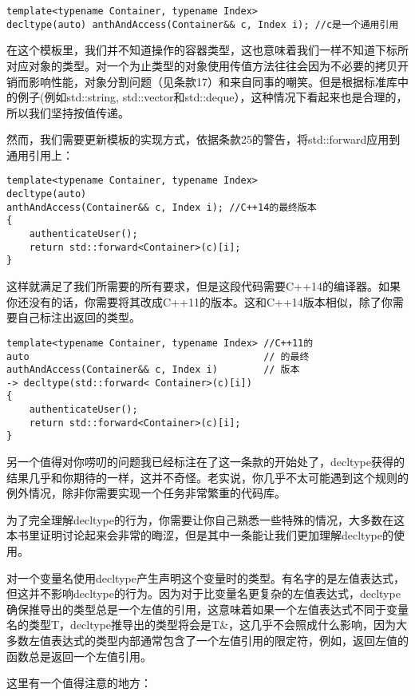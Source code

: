 \begin{lstlisting}
template<typename Container, typename Index>
decltype(auto) anthAndAccess(Container&& c, Index i); //c是一个通用引用
\end{lstlisting}

在这个模板里，我们并不知道操作的容器类型，这也意味着我们一样不知道下标所对应对象的类型。对一个为止类型的对象使用传值方法往往会因为不必要的拷贝开销而影响性能，对象分割问题（见条款17）和来自同事的嘲笑。但是根据标准库中的例子(例如std::string, std::vector和std::deque），这种情况下看起来也是合理的，所以我们坚持按值传递。

然而，我们需要更新模板的实现方式，依据条款25的警告，将std::forward应用到通用引用上：

\begin{lstlisting}
template<typename Container, typename Index>
decltype(auto)
anthAndAccess(Container&& c, Index i); //C++14的最终版本
{
	authenticateUser();
	return std::forward<Container>(c)[i];
}
\end{lstlisting}

这样就满足了我们所需要的所有要求，但是这段代码需要C++14的编译器。如果你还没有的话，你需要将其改成C++11的版本。这和C++14版本相似，除了你需要自己标注出返回的类型。

\begin{lstlisting}
template<typename Container, typename Index> //C++11的 
auto                                         // 的最终 
authAndAccess(Container&& c, Index i)        // 版本
-> decltype(std::forward< Container>(c)[i]) 
{ 
	authenticateUser(); 
	return std::forward<Container>(c)[i]; 
}
\end{lstlisting}

另一个值得对你唠叨的问题我已经标注在了这一条款的开始处了，decltype获得的结果几乎和你期待的一样，这并不奇怪。老实说，你几乎不太可能遇到这个规则的例外情况，除非你需要实现一个任务非常繁重的代码库。

为了完全理解decltype的行为，你需要让你自己熟悉一些特殊的情况，大多数在这本书里证明讨论起来会非常的晦涩，但是其中一条能让我们更加理解decltype的使用。

对一个变量名使用decltype产生声明这个变量时的类型。有名字的是左值表达式，但这并不影响decltype的行为。因为对于比变量名更复杂的左值表达式，decltype确保推导出的类型总是一个左值的引用，这意味着如果一个左值表达式不同于变量名的类型T，decltype推导出的类型将会是T\&，这几乎不会照成什么影响，因为大多数左值表达式的类型内部通常包含了一个左值引用的限定符，例如，返回左值的函数总是返回一个左值引用。

这里有一个值得注意的地方：

